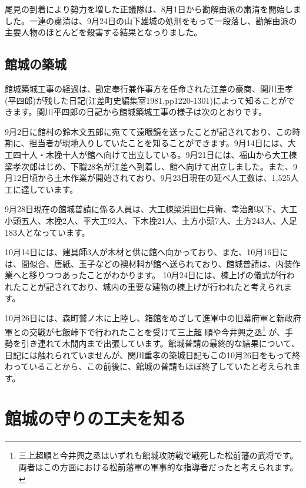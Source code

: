 \documentclass[11pt,report]{jsbook}
\begin{document}
尾見の到着により勢力を増した正議隊は、8月1日から勘解由派の粛清を開始しました。一連の粛清は、9月24日の山下雄城の処刑をもって一段落し、勘解由派の主要人物のほとんどを殺害する結果となっりました。

\section{館城の築城}
館城築城工事の経過は、勘定奉行兼作事方を任命された江差の豪商、関川重孝(平四郎)が残した日記(江差町史編集室1981,pp1220-1301)によって知ることができます。関川平四郎の日記から館城築城工事の様子は次のとおりです。

9月2日に館村の鈴木文五郎に宛てて遠眼鏡を送ったことが記されており、この時期に、担当者が現地入りしていたことを知ることができます。9月14日には、大工四十人・木挽十人が館へ向けて出立している。9月21日には、福山から大工棟梁孝次郎はじめ、下職28名が江差へ到着し、館へ向けて出立しました。また、9月12日頃から土木作業が開始されており、9月23日現在の延べ人工数は、1,525人工に達しています。

9月28日現在の館城普請に係る人員は、大工棟梁浜田仁兵衛、幸治郎以下、大工小頭五人、木挽2人、平大工92人、下木挽21人、土方小頭7人、土方243人、人足183人となっています。

10月14日には、建具師3人が木材と供に館へ向かっており、また、10月16日には、間似合、唐紙、玉子などの襖材料が館へ送られており、館城普請は、内装作業へと移りつつあったことがわかります。
10月24日には、棟上げの儀式が行われたことが記されており、城内の重要な建物の棟上げが行われたと考えられます。

10月26日には、森町鷲ノ木に上陸し、箱館をめざして進軍中の旧幕府軍と新政府軍との交戦が七飯峠下で行われたことを受けて三上超
順や今井興之丞\footnote{
三上超順と今井興之丞はいずれも館城攻防戦で戦死した松前藩の武将です。両者はこの方面における松前藩軍の軍事的な指導者だったと考えられます。
}
が、手勢を引き連れて木間内まで出張しています。館城普請の最終的な結果について、日記には触れられていませんが、関川重孝の築城日記もこの10月26日をもって終わっていることから、この前後に、館城の普請もほぼ終了していたと考えられます。

\newpage
\chapter{館城の守りの工夫を知る}
\end{document}
